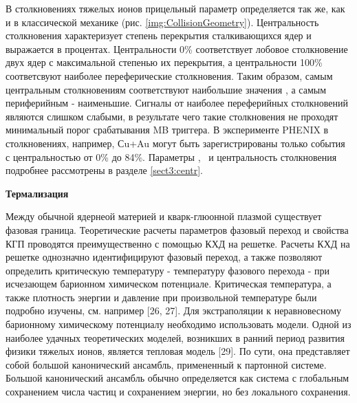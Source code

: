 В столкновениях тяжелых ионов прицельный параметр определяется так же, как и в классической механике (рис. \ref{img:CollisionGeometry}). Центральность столкновения характеризует степень перекрытия сталкивающихся ядер и выражается в процентах. Центральности 0\% соответствует лобовое столкновение двух ядер с максимальной степенью их перекрытия, а центральности 100\% соответсвуют наиболее переферические столкновения.
Таким образом, самым центральным столкновениям соответствуют наибольшие значения \Npart, а самым периферийным - наименьшие.
Сигналы от наиболее переферийных столкновений являются слишком слабыми, в результате чего такие столкновения не проходят минимальный порог срабатывания MB триггера. В эксперименте PHENIX в столкновениях, например, Сu+Au могут быть зарегистрированы только события с центральностью от 0\% до 84\%.
Параметры \Npart, \Ncoll \ и центральность столкновения подробнее рассмотрены в разделе \ref{sect3:centr}.



\textbf{Термализация}

Между обычной ядернеой материей и кварк-глюонной плазмой существует фазовая граница. Теоретические расчеты параметров фазовый переход и свойства КГП проводятся преимущественно с помощью КХД на решетке. Расчеты КХД на решетке однозначно идентифицируют фазовый переход, а также позволяют определить критическую температуру - температуру фазового перехода - при исчезающем барионном химическом потенциале. Критическая температура, а также плотность энергии и давление при произвольной температуре были подробно изучены, см. например [26, 27]. Для экстраполяции к неравновесному барионному химическому потенциалу необходимо использовать модели. Одной из наиболее удачных теоретических моделей, возникших в ранний период развития физики тяжелых ионов, является тепловая модель [29]. По сути, она представляет собой большой канонический ансамбль, примененный к партонной системе. Большой канонический ансамбль обычно определяется как система с глобальным сохранением числа частиц и сохранением энергии, но без локального сохранения.

